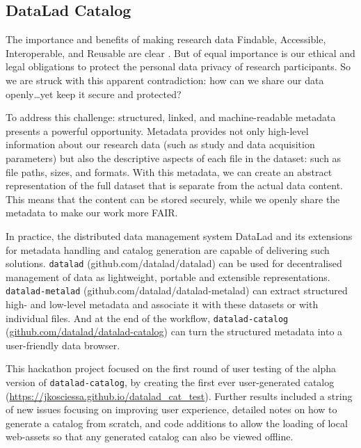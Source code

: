 \documentclass[../main.tex]{subfiles}
\begin{document}
\subsection{DataLad Catalog}


The importance and benefits of making research data Findable, Accessible, Interoperable, and Reusable are clear \citep{Wilkinson2016}. But of equal importance is our ethical and legal obligations to protect the personal data privacy of research participants. So we are struck with this apparent contradiction: how can we share our data openly…yet keep it secure and protected?

To address this challenge: structured, linked, and machine-readable metadata presents a powerful opportunity. Metadata provides not only high-level information about our research data (such as study and data acquisition parameters) but also the descriptive aspects of each file in the dataset: such as file paths, sizes, and formats. With this metadata, we can create an abstract representation of the full dataset that is separate from the actual data content. This means that the content can be stored securely, while we openly share the metadata to make our work more FAIR.

In practice, the distributed data management system DataLad \citep{Halchenko2021} and its extensions for metadata handling and catalog generation are capable of delivering such solutions. \texttt{datalad} (github.com/datalad/datalad) can be used for decentralised management of data as lightweight, portable and extensible representations. \texttt{datalad-metalad} (github.com/datalad/datalad-metalad) can extract structured high- and low-level metadata and associate it with these datasets or with individual files. And at the end of the workflow, \texttt{datalad-catalog} (\url{github.com/datalad/datalad-catalog}) can turn the structured metadata into a user-friendly data browser.

This hackathon project focused on the first round of user testing of the alpha version of \texttt{datalad-catalog}, by creating the first ever user-generated catalog (\url{https://jkosciessa.github.io/datalad_cat_test}). Further results included a string of new issues focusing on improving user experience, detailed notes on how to generate a catalog from scratch, and code additions to allow the loading of local web-assets so that any generated catalog can also be viewed offline.
\end{document}
